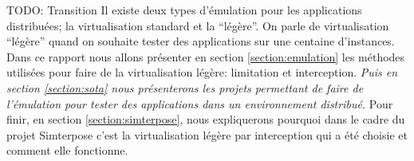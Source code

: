 {\color{red}TODO: Transition}
Il existe deux types d'émulation pour les applications distribuées; la virtualisation standard et la ``légère''. On parle de virtualisation ``légère'' quand on souhaite tester des applications sur une centaine d'instances. Dans ce rapport nous allons présenter en section \ref{section:emulation} les méthodes utilisées pour faire de la virtualisation légère: limitation et interception. \textit{Puis en section \ref{section:sota} nous présenterons les projets permettant de faire de l'émulation pour tester des applications dans un environnement distribué.} Pour finir, en section \ref{section:simterpose}, nous expliquerons pourquoi dans le cadre du projet Simterpose c'est la virtualisation légère par interception qui a été choisie et comment elle fonctionne.
